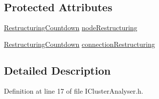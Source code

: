 \subsection*{\-Protected \-Attributes}
\begin{DoxyCompactItemize}
\item 
\hyperlink{structcryomesh_1_1manipulators_1_1IClusterAnalyser_1_1RestructuringCountdown}{\-Restructuring\-Countdown} \hyperlink{classcryomesh_1_1manipulators_1_1IClusterAnalyser_a78d90b9829e4188ded3d94da49c6887a}{node\-Restructuring}
\item 
\hyperlink{structcryomesh_1_1manipulators_1_1IClusterAnalyser_1_1RestructuringCountdown}{\-Restructuring\-Countdown} \hyperlink{classcryomesh_1_1manipulators_1_1IClusterAnalyser_ae0442c245ec17e22d51ffd05c3a2f86e}{connection\-Restructuring}
\end{DoxyCompactItemize}


\subsection{\-Detailed \-Description}


\-Definition at line 17 of file \-I\-Cluster\-Analyser.\-h.



